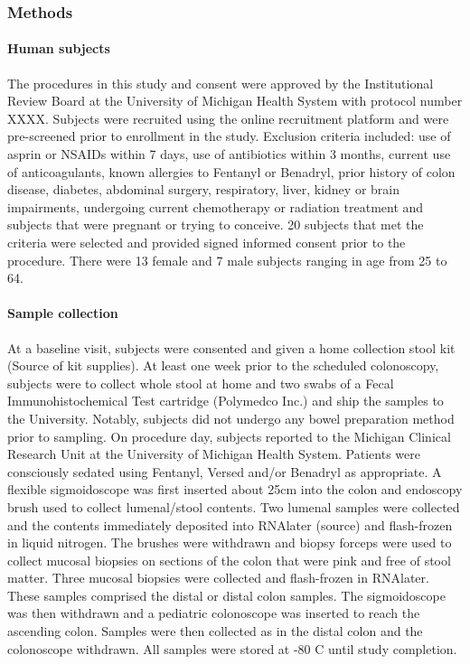 \documentclass[11pt,]{article}
\let\oldparagraph\paragraph
\renewcommand{\paragraph}[1]{\oldparagraph{#1}\mbox{}}
\begin{document}
\subsubsection{Methods}\label{methods}

\paragraph{Human subjects}\label{human-subjects}

The procedures in this study and consent were approved by the
Institutional Review Board at the University of Michigan Health System
with protocol number XXXX. Subjects were recruited using the online
recruitment platform and were pre-screened prior to enrollment in the
study. Exclusion criteria included: use of asprin or NSAIDs within 7
days, use of antibiotics within 3 months, current use of anticoagulants,
known allergies to Fentanyl or Benadryl, prior history of colon disease,
diabetes, abdominal surgery, respiratory, liver, kidney or brain
impairments, undergoing current chemotherapy or radiation treatment and
subjects that were pregnant or trying to conceive. 20 subjects that met
the criteria were selected and provided signed informed consent prior to
the procedure. There were 13 female and 7 male subjects ranging in age
from 25 to 64.

\paragraph{Sample collection}\label{sample-collection}

At a baseline visit, subjects were consented and given a home collection
stool kit (Source of kit supplies). At least one week prior to the
scheduled colonoscopy, subjects were to collect whole stool at home and
two swabs of a Fecal Immunohistochemical Test cartridge (Polymedco Inc.)
and ship the samples to the University. Notably, subjects did not
undergo any bowel preparation method prior to sampling. On procedure
day, subjects reported to the Michigan Clinical Research Unit at the
University of Michigan Health System. Patients were consciously sedated
using Fentanyl, Versed and/or Benadryl as appropriate. A flexible
sigmoidoscope was first inserted about 25cm into the colon and endoscopy
brush used to collect lumenal/stool contents. Two lumenal samples were
collected and the contents immediately deposited into RNAlater (source)
and flash-frozen in liquid nitrogen. The brushes were withdrawn and
biopsy forceps were used to collect mucosal biopsies on sections of the
colon that were pink and free of stool matter. Three mucosal biopsies
were collected and flash-frozen in RNAlater. These samples comprised the
distal or distal colon samples. The sigmoidoscope was then withdrawn and
a pediatric colonoscope was inserted to reach the ascending colon.
Samples were then collected as in the distal colon and the colonoscope
withdrawn. All samples were stored at -80 C until study completion.
\end{document}
